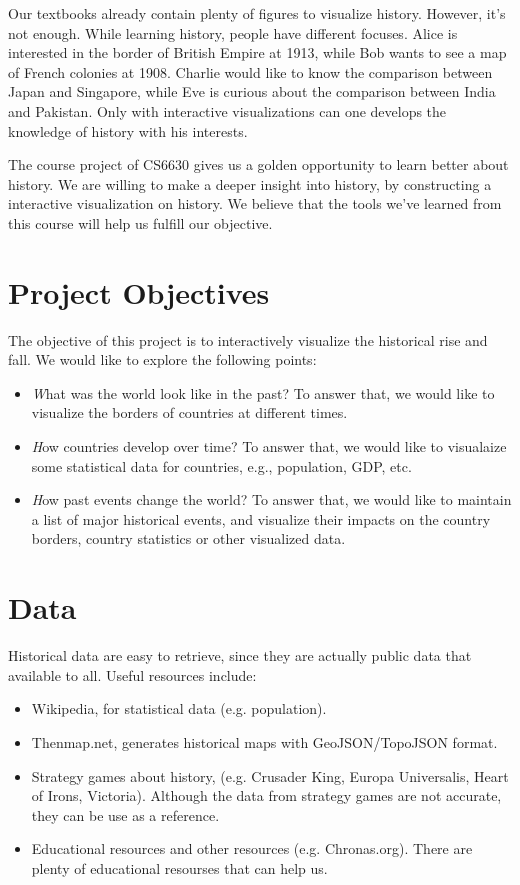 \documentclass[12pt, fullpage,letterpaper]{article}
\begin{document}
Our textbooks already contain plenty of figures to visualize history. However,
it's not enough. While learning history, people have different focuses.  Alice
is interested in the border of British Empire at 1913, while Bob wants to see a
map of French colonies at 1908. Charlie would like to know the comparison
between Japan and Singapore, while Eve is curious about the comparison between
India and Pakistan.  Only with interactive visualizations can one develops the
knowledge of history with his interests.

The course project of CS6630 gives us a golden opportunity to learn better
about history.  We are willing to make a deeper insight into history, by
constructing a interactive visualization on history. We believe that the tools
we've learned from this course will help us fulfill our objective.

\section{Project Objectives}
The objective of this project is to interactively visualize the historical rise
and fall.  We would like to explore the following points:
\begin{itemize}
    \item {\emph What was the world look like in the past?} To answer that, we
        would like to visualize the borders of countries at different times.
    \item {\emph How countries develop over time?} To answer that, we would
        like to visualaize some statistical data for countries, e.g.,
        population, GDP, etc.
    \item {\emph How past events change the world?} To answer that, we would
        like to maintain a list of major historical events, and visualize their
        impacts on the country borders, country statistics or other visualized
        data.
\end{itemize}
\section{Data}
Historical data are easy to retrieve, since they are actually public data that available to all.
Useful resources include:

\begin{itemize}
    \item Wikipedia, for statistical data (e.g. population).
    \item Thenmap.net, generates historical maps with GeoJSON/TopoJSON format.
    \item Strategy games about history, (e.g. Crusader King, Europa Universalis, Heart of Irons, Victoria). Although the data from strategy games are not accurate, they can be use
        as a reference.
    \item Educational resources and other resources (e.g. Chronas.org). There are plenty of educational resourses that can help us.
\end{itemize}
\end{document}
